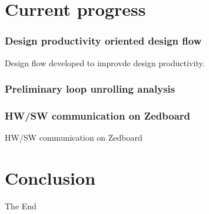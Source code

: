 \documentclass{beamer}
\begin{document}
\section{Current progress}
\begin{frame}

\frametitle{Design productivity oriented design flow}
Design flow developed to improvde design productivity.

\end{frame}

\begin{frame}

\frametitle{Preliminary loop unrolling analysis}
\end{frame}

\begin{frame}

\frametitle{HW/SW communication on Zedboard}
HW/SW communication on Zedboard

\end{frame}

\section{Conclusion}
\begin{frame}
\Huge{\centerline{The End}}
\end{frame}

\end{document}
